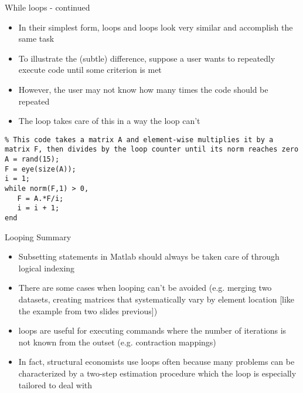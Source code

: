 \documentclass[english,xcolor=dvipsnames]{beamer}
\begin{document}
\begin{frame}[fragile]{While loops - continued}
\begin{itemize}
	\item In their simplest form,  loops and  loops look very similar and accomplish the same task
	\item To illustrate the (subtle) difference, suppose a user wants to repeatedly execute code until some criterion is met
	\item However, the user may not know how many times the code should be repeated
	\item The  loop takes care of this in a way the  loop can't
\end{itemize}
\begin{lstlisting}
% This code takes a matrix A and element-wise multiplies it by a matrix F, then divides by the loop counter until its norm reaches zero
A = rand(15);
F = eye(size(A));
i = 1;
while norm(F,1) > 0,
   F = A.*F/i;
   i = i + 1;
end
\end{lstlisting}
\end{frame}

\begin{frame}[fragile]{Looping Summary}
\begin{itemize}
	\item Subsetting  statements in Matlab should always be taken care of through logical indexing
	\item There are some cases when looping can't be avoided (e.g. merging two datasets, creating matrices that systematically vary by element location [like the example from two slides previous])
	\item {} loops are useful for executing commands where the number of iterations is not known from the outset (e.g. contraction mappings)
	\item In fact, structural economists use  loops often because many problems can be characterized by a two-step estimation procedure which the  loop is especially tailored to deal with
\end{itemize}
\end{frame}
\end{document}
